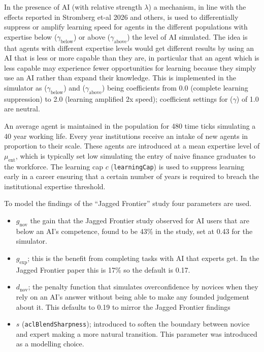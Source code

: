 \documentclass[11pt]{article}
\begin{document}
In the presence of AI (with relative strength $\lambda$) a mechanism, in line with the effects reported in Stromberg et-al 2026 and others, is used to differentially suppress or amplify learning speed for agents in the different populations with expertise below ($\gamma_{\mathrm{below}}$) or above ($\gamma_{\mathrm{above}}$) the level of AI simulated. The idea is that agents with different expertise levels would get different results by using an AI that is less or more capable than they are, in particular that an agent which is less capable may experience fewer opportunities for learning because they simply use an AI rather than expand their knowledge. This is implemented in the simulator as ($\gamma_{\mathrm{below}}$) and ($\gamma_{\mathrm{above}}$) being coefficients from 0.0 (complete learning suppression) to 2.0 (learning amplified 2x speed); coefficient settings for ($\gamma$) of 1.0 are neutral.

An average agent is maintained in the population for 480 time ticks simulating a 40 year working life. Every year institutions receive an intake of new agents in proportion to their scale. These agents are introduced at a mean expertise level of $\mu_{\mathrm{ent}}$, which is typically set low simulating the entry of naive finance graduates to the workforce. The learning cap $c$ (\texttt{learningCap}) is used to suppress learning early in a career ensuring that a certain number of years is required to breach the institutional expertise threshold.

To model the findings of the ``Jagged Frontier'' study \cite{fabrizio_dellacqua_navigating_nodate} four parameters are used.
\begin{itemize}
    \item $g_{\mathrm{nov}}$ the gain that the Jagged Frontier study observed for AI users that are below an AI's competence, found to be 43\% in the study, set at 0.43 for the simulator. 
    \item $g_{\mathrm{exp}}$; this is the benefit from completing tasks with AI that experts get. In the Jagged Frontier paper this is 17\% so the default is 0.17.
    \item $d_{\mathrm{nov}}$; the penalty function that simulates overconfidence by novices when they rely on an AI's answer without being able to make any founded judgement about it. This defaults to 0.19 to mirror the Jagged Frontier findings
    \item $s$ (\texttt{aclBlendSharpness}); introduced to soften the boundary between novice and expert making a more natural transition. This parameter was introduced as a modelling choice.
\end{itemize}
\end{document}
